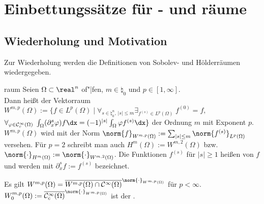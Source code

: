 
\chapter{%
    Einbettungssätze für - und räume%
}

\section{%
    Wiederholung und Motivation%
}

\begin{Bem}
    Zur Wiederholung werden die Definitionen von Sobolev- und Hölderräumen wiedergegeben.
\end{Bem}

\begin{Def}{raum}
    Seien $\Omega \subset \real^n$ of"|fen, $m \in \natural_0$ und $p \in [1, \infty]$.\\
    Dann heißt der Vektorraum
    $W^{m,p}(\Omega) := \{f \in L^p(\Omega) \;|\; \forall_{s \in \natural_0^n,\, |s| \le m}
    \exists_{f^{(s)} \in L^p(\Omega)}\; f^{(0)} = f,$\\
    $\forall_{\varphi \in \C^\infty_c(\Omega)}\;
    \int_\Omega (\partial_x^s \varphi) f \dx = (-1)^{|s|} \int_\Omega \varphi f^{(s)} \dx\}$
     der Ordnung $m$ mit Exponent $p$.\\
    $W^{m,p}(\Omega)$ wird mit der Norm
    $\norm{f}_{W^{m,p}(\Omega)} := \sum_{|s| \le m} \norm{f^{(s)}}_{L^p(\Omega)}$ versehen.
    Für $p = 2$ schreibt man auch $H^m(\Omega) := W^{m,2}(\Omega)$ bzw.
    $\norm{\cdot}_{H^m(\Omega)} := \norm{\cdot}_{W^{m,2}(\Omega)}$.
    Die Funktionen $f^{(s)}$ für $|s| \ge 1$ heißen  von $f$
    und werden mit $\partial_x^s f := f^{(s)}$ bezeichnet.
\end{Def}

\begin{Bem}
    Es gilt $W^{m,p}(\Omega) =
    \overline{W^{m,p}(\Omega) \cap \C^\infty(\Omega)}^{\norm{\cdot}_{W^{m,p}(\Omega)}}$
    für $p < \infty$.\\
    $W^{m,p}_0(\Omega) := \overline{\C^\infty_c(\Omega)}^{\norm{\cdot}_{W^{m,p}(\Omega)}}$
    ist der .
\end{Bem}


